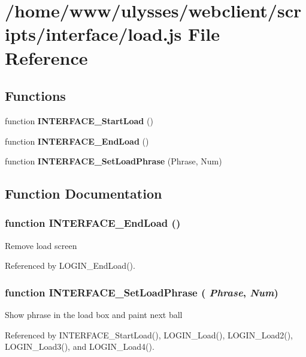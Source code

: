 \section{/home/www/ulysses/webclient/scripts/interface/load.js File Reference}
\label{interface_2load_8js}
\subsection*{Functions}
\begin{CompactItemize}
\item 
function {\bf INTERFACE\_\-StartLoad} ()
\item 
function {\bf INTERFACE\_\-EndLoad} ()
\item 
function {\bf INTERFACE\_\-SetLoadPhrase} (Phrase, Num)
\end{CompactItemize}


\subsection{Function Documentation}
\subsubsection{\setlength{\rightskip}{0pt plus 5cm}function INTERFACE\_\-EndLoad ()}\label{interface_2load_8js_9fd52b1b8c058912ffd1501cad73e19a}


Remove load screen 

Referenced by LOGIN\_\-EndLoad().
\subsubsection{\setlength{\rightskip}{0pt plus 5cm}function INTERFACE\_\-SetLoadPhrase ( {\em Phrase}, \/   {\em Num})}\label{interface_2load_8js_17ce560a74b87126a2c00d369eb42597}


Show phrase in the load box and paint next ball 

Referenced by INTERFACE\_\-StartLoad(), LOGIN\_\-Load(), LOGIN\_\-Load2(), LOGIN\_\-Load3(), and LOGIN\_\-Load4().
